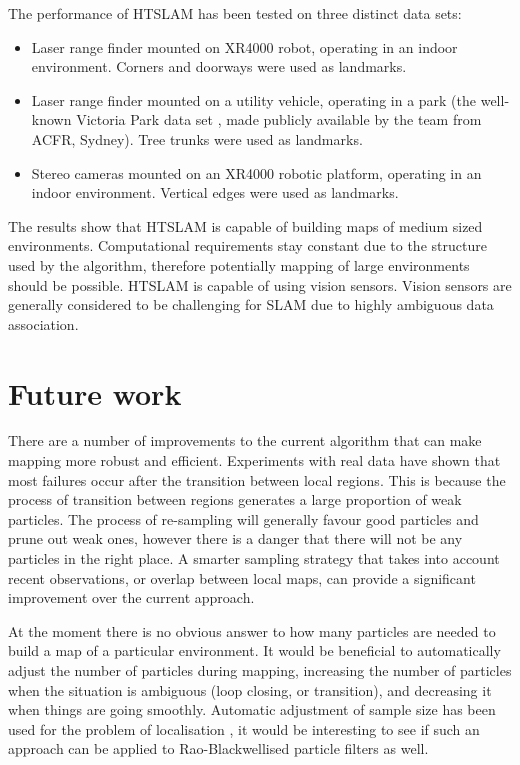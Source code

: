 The performance of HTSLAM has been tested on three distinct data sets:

\begin{itemize}
\item Laser range finder mounted on XR4000 robot, operating in an indoor
environment. Corners and doorways were used as landmarks.

\item Laser range finder mounted on a utility vehicle, operating in a
  park (the well-known Victoria Park data set \cite{VP_dataset}, made
  publicly available by the team from ACFR, Sydney). Tree trunks were
  used as landmarks.

\item Stereo cameras mounted on an XR4000 robotic platform, operating
  in an indoor environment. Vertical edges were used as landmarks.

\end{itemize}

The results show that HTSLAM is capable of building maps of medium
sized environments. Computational requirements stay constant due to
the structure used by the algorithm, therefore potentially mapping of
large environments should be possible. HTSLAM is capable of using
vision sensors. Vision sensors are generally considered to be
challenging for SLAM due to highly ambiguous data association.


\section{Future work}

There are a number of improvements to the current algorithm that can
make mapping more robust and efficient. Experiments with real data
have shown that most failures occur after the transition between local
regions. This is because the process of transition between regions
generates a large proportion of weak particles. The process of
re-sampling will generally favour good particles and prune out weak
ones, however there is a danger that there will not be any particles
in the right place. A smarter sampling strategy that takes into
account recent observations, or overlap between local maps, can
provide a significant improvement over the current approach.

At the moment there is no obvious answer to how many particles are
needed to build a map of a particular environment. It would be
beneficial to automatically adjust the number of particles during
mapping, increasing the number of particles when the situation is
ambiguous (loop closing, or transition), and decreasing it when things
are going smoothly. Automatic adjustment of sample size has been used
for the problem of localisation \cite{KLDSampling}, it would be
interesting to see if such an approach can be applied to
Rao-Blackwellised particle filters as well.

